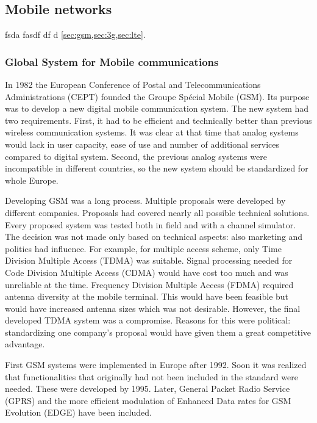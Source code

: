 \subsection{Mobile networks}
\label{sec:networks}

fsda fasdf df d \cref{sec:gsm,sec:3g,sec:lte}.

\subsubsection{Global System for Mobile communications}
\label{sec:gsm}
In 1982 the European Conference of Postal and Telecommunications Administrations (CEPT) founded the Groupe Spécial Mobile (GSM). Its purpose was to develop a new digital mobile communication system.  The new system had two requirements. First, it had to be efficient and technically better than previous wireless communication systems. It was clear at that time that analog systems would lack in user capacity, ease of use and number of additional services compared to digital system. Second, the previous analog systems were incompatible in different countries, so the new system should be standardized for whole Europe. \cite{molisch}

Developing GSM was a long process. Multiple proposals were developed by different companies. Proposals had covered nearly all possible technical solutions. Every proposed system was tested both in field and with a channel simulator. The decision was not made only based on technical aspects: also marketing and politics had influence. For example, for multiple access scheme, only Time Division Multiple Access (TDMA) was suitable. Signal processing needed for Code Division Multiple Access (CDMA) would have cost too much and was unreliable at the time. Frequency Division Multiple Access (FDMA) required antenna diversity at the mobile terminal. This would have been feasible but would have increased antenna sizes which was not desirable. However, the final developed TDMA system was a compromise. Reasons for this were political: standardizing one company's proposal would have given them a great competitive advantage. \cite{molisch}

First GSM systems were implemented in Europe after 1992. Soon it was realized that functionalities that originally had not been included in the standard were needed. These were developed by 1995. Later, General Packet Radio Service (GPRS) and the more efficient modulation of Enhanced Data rates for GSM Evolution (EDGE) have been included. \cite{molisch}

